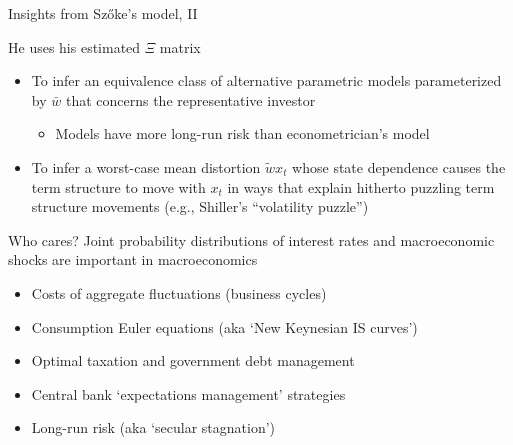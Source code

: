 \documentclass{beamer}
\theoremstyle{Definition}
\begin{document}
\begin{frame}{Insights from Sz\H{o}ke's  model, II}

He uses his  estimated $\Xi$ matrix

\begin{itemize}
\item To infer an equivalence class of alternative parametric models parameterized by $\bar w$ that concerns the representative investor
 \begin{itemize}
 \item  \small{Models have  more long-run risk than econometrician's model }
 \end{itemize}
\item To infer a  worst-case mean distortion $\tilde w x_t$ whose state dependence causes the term structure to move with $x_t$ in ways that  explain hitherto puzzling term structure movements (e.g., Shiller's ``volatility puzzle'')
\end{itemize}

\end{frame}

\begin{frame}{Who cares?}
Joint probability distributions of interest rates and  macroeconomic shocks  are important in macroeconomics
\begin{itemize}
 \item Costs of aggregate fluctuations (business cycles)
 \item Consumption Euler equations (aka `New Keynesian IS curves')
 \item Optimal taxation and government  debt management
 \item Central bank `expectations management' strategies
 \item Long-run risk (aka `secular stagnation')
\end{itemize}

\end{frame}
%
%
%
%
%
%
%
\end{document}
